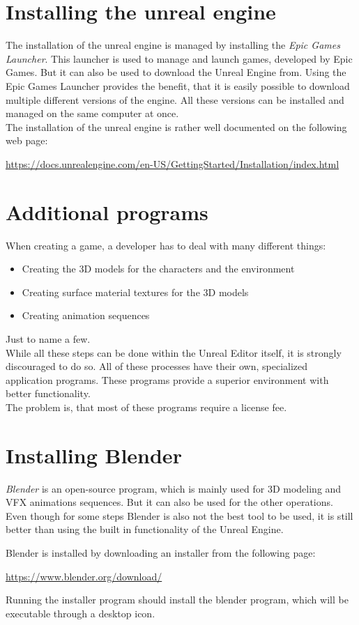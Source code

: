 \section{Installing the unreal engine}

The installation of the unreal engine is managed by installing the \textit{Epic Games Launcher}. This launcher is used to manage and launch games, developed by Epic Games. But it can also be used to download the Unreal Engine from. Using the Epic Games Launcher provides the benefit, that it is easily possible to download multiple different versions of the engine. All these versions can be installed and managed on the same computer at once.\\
The installation of the unreal engine is rather well documented on the following web page:

\url{https://docs.unrealengine.com/en-US/GettingStarted/Installation/index.html}

\section{Additional programs}

When creating a game, a developer has to deal with many different things:
\begin{itemize}
\item Creating the 3D models for the characters and the environment
\item Creating surface material textures for the 3D models
\item Creating animation sequences
\end{itemize}

Just to name a few.\\
While all these steps can be done within the Unreal Editor itself, it is strongly discouraged to do so. All of these processes have their own, specialized application programs. These programs provide a superior environment with better functionality.\\
The problem is, that most of these programs require a license fee.

\section{Installing Blender}

\textit{Blender}\cite{Blender} is an open-source program, which is mainly used for 3D modeling and VFX animations sequences. But it can also be used for the other operations. Even though for some steps Blender is also not the best tool to be used, it is still better than using the built in functionality of the Unreal Engine.

Blender is installed by downloading an installer from the following page:

\url{https://www.blender.org/download/}

Running the installer program should install the blender program, which will be executable through a desktop icon.